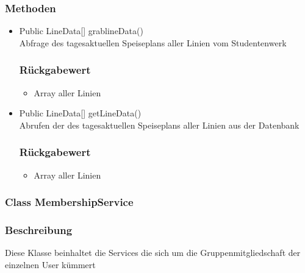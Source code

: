 \documentclass[a4paper]{scrreprt}
\begin{document}
\subsubsection*{Methoden}
\begin{addmargin}[25pt]{0pt}
\begin{itemize}

\item Public LineData[] grablineData()\\
	Abfrage des tagesaktuellen Speiseplans aller Linien vom Studentenwerk

	\subsubsection*{Rückgabewert}
	\begin{itemize}
	\item Array aller Linien 
	\end{itemize}
	
\item Public LineData[] getLineData()\\
	Abrufen der des tagesaktuellen Speiseplans aller Linien aus der Datenbank
	\subsubsection*{Rückgabewert}
	\begin{itemize}
	\item Array aller Linien
	\end{itemize}
\end{itemize}
\end{addmargin}

\subsubsection{Class MembershipService}
\subsubsection*{Beschreibung}
Diese Klasse beinhaltet die Services die sich um die Gruppenmitgliedschaft der einzelnen User kümmert
\end{document}
